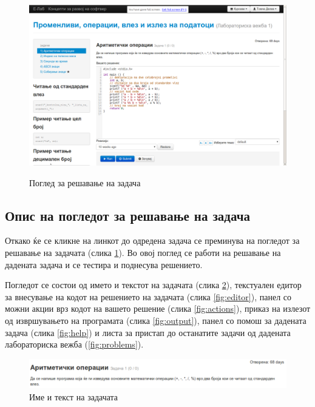 \begin{figure}[htbp]
\centering
\includegraphics[width=\textwidth]{images/elab/screen}
\label{fig:screen}
\caption{Поглед за решавање на задача}
\end{figure}

\subsection{Опис на погледот за решавање на задача}

Откако ќе се кликне на линкот до одредена задача се преминува на погледот за
решавање на задачата (слика \ref{fig:screen}). Во овој поглед се работи на
решавање на дадената задача и се тестира и поднесува решението.

Погледот се состои од името и текстот на задачата (слика \ref{fig:text}),
текстуален едитор за внесување на кодот на решението на задачата (слика
\ref{fig:editor}), панел со можни акции врз кодот на вашето решение (слика
\ref{fig:actions}), приказ на излезот од извршувањето на програмата (слика
\ref{fig:output}), панел со помош за дадената задача (слика \ref{fig:help}) и
листа за пристап до останатите задачи од дадената лабораториска вежба
(\ref{fig:problems}).

\begin{figure}[htbp]
\centering
\includegraphics[scale=.4]{images/elab/text}
\caption{Име и текст на задачата}
\label{fig:text}
\end{figure}

